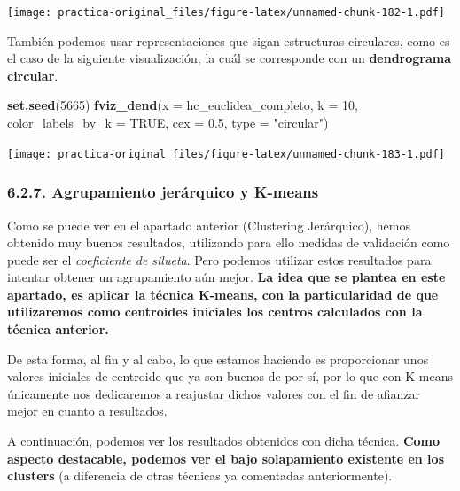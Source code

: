 \documentclass[spanish,]{article}
\newenvironment{Shaded}{\begin{snugshade}}{\end{snugshade}}
\newcommand{\KeywordTok}[1]{\textcolor[rgb]{0.13,0.29,0.53}{\textbf{#1}}}
\newcommand{\DataTypeTok}[1]{\textcolor[rgb]{0.13,0.29,0.53}{#1}}
\newcommand{\DecValTok}[1]{\textcolor[rgb]{0.00,0.00,0.81}{#1}}
\newcommand{\FloatTok}[1]{\textcolor[rgb]{0.00,0.00,0.81}{#1}}
\newcommand{\StringTok}[1]{\textcolor[rgb]{0.31,0.60,0.02}{#1}}
\newcommand{\OtherTok}[1]{\textcolor[rgb]{0.56,0.35,0.01}{#1}}
\newcommand{\NormalTok}[1]{#1}
\begin{document}
\texttt{[image: practica-original\_files/figure-latex/unnamed-chunk-182-1.pdf]}

También podemos usar representaciones que sigan estructuras circulares,
como es el caso de la siguiente visualización, la cuál se corresponde
con un \textbf{dendrograma circular}.

\begin{Shaded}
\begin{Highlighting}[]
\KeywordTok{set.seed}\NormalTok{(}\DecValTok{5665}\NormalTok{)}
\KeywordTok{fviz_dend}\NormalTok{(}\DataTypeTok{x =}\NormalTok{ hc_euclidea_completo,}
          \DataTypeTok{k =} \DecValTok{10}\NormalTok{,}
          \DataTypeTok{color_labels_by_k =} \OtherTok{TRUE}\NormalTok{,}
          \DataTypeTok{cex =} \FloatTok{0.5}\NormalTok{,}
          \DataTypeTok{type =} \StringTok{"circular"}\NormalTok{)}
\end{Highlighting}
\end{Shaded}

\texttt{[image: practica-original\_files/figure-latex/unnamed-chunk-183-1.pdf]}

\subsubsection{6.2.7. Agrupamiento jerárquico y
K-means}\label{agrupamiento-jerarquico-y-k-means}

Como se puede ver en el apartado anterior (Clustering Jerárquico), hemos
obtenido muy buenos resultados, utilizando para ello medidas de
validación como puede ser el \emph{coeficiente de silueta}. Pero podemos
utilizar estos resultados para intentar obtener un agrupamiento aún
mejor. \textbf{La idea que se plantea en este apartado, es aplicar la
técnica K-means, con la particularidad de que utilizaremos como
centroides iniciales los centros calculados con la técnica anterior.}

De esta forma, al fin y al cabo, lo que estamos haciendo es proporcionar
unos valores iniciales de centroide que ya son buenos de por sí, por lo
que con K-means únicamente nos dedicaremos a reajustar dichos valores
con el fin de afianzar mejor en cuanto a resultados.

A continuación, podemos ver los resultados obtenidos con dicha técnica.
\textbf{Como aspecto destacable, podemos ver el bajo solapamiento
existente en los clusters} (a diferencia de otras técnicas ya comentadas
anteriormente).
\end{document}
